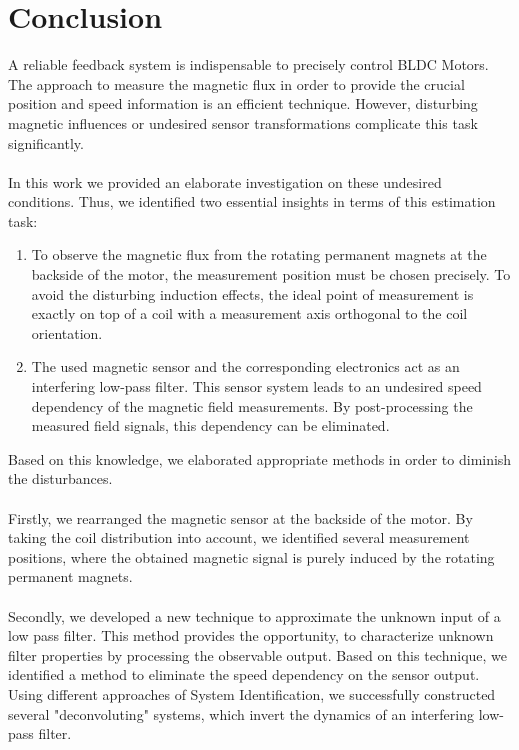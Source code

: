 \documentclass[english]{isasthesis}
\begin{document}
	\chapter{Conclusion}\label{fazit}
	A reliable feedback system is indispensable to precisely control BLDC Motors. The approach to measure the magnetic flux in order to provide the crucial position and speed information is an efficient technique. However, disturbing magnetic influences or  undesired sensor transformations complicate this task significantly.\\\\
	In this work we provided an elaborate investigation on these undesired conditions. Thus, we identified two essential insights in terms of this estimation task:
	\begin{enumerate}
	\item To observe the magnetic flux from the rotating permanent magnets at the backside of the motor, the measurement position must be chosen precisely. To avoid the disturbing induction effects, the ideal point of measurement is exactly on top of a coil with a measurement axis orthogonal to the coil orientation.
	\item The used magnetic sensor and the corresponding electronics act as an interfering low-pass filter. This sensor system leads to an undesired speed dependency of the magnetic field measurements. By post-processing the measured field signals, this dependency can be eliminated. 
	\end{enumerate}
	Based on this knowledge, we elaborated appropriate methods in order to diminish the disturbances.\\\\
	Firstly, we rearranged the magnetic sensor at the backside of the motor. By taking the coil distribution into account, we identified several measurement positions, where the obtained magnetic signal is purely induced by the rotating permanent magnets.\\\\
	Secondly, we developed a new technique to approximate the unknown input of a low pass filter. This method provides the opportunity, to characterize unknown filter properties by processing the observable output. Based on this technique, we identified a method to eliminate the speed dependency on the sensor output. Using different approaches of System Identification, we successfully constructed several "deconvoluting" systems, which invert the dynamics of an interfering low-pass filter.\\\\
\end{document}

